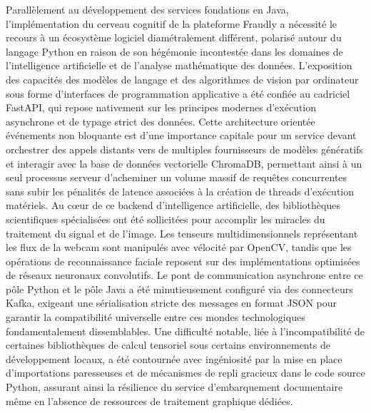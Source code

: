 Parallèlement au développement des services fondations en Java, l'implémentation du cerveau cognitif de la plateforme Fraudly a nécessité le recours à un écosystème logiciel diamétralement différent, polarisé autour du langage Python en raison de son hégémonie incontestée dans les domaines de l'intelligence artificielle et de l'analyse mathématique des données. L'exposition des capacités des modèles de langage et des algorithmes de vision par ordinateur sous forme d'interfaces de programmation applicative a été confiée au cadriciel FastAPI, qui repose nativement sur les principes modernes d'exécution asynchrone et de typage strict des données. Cette architecture orientée événements non bloquante est d'une importance capitale pour un service devant orchestrer des appels distants vers de multiples fournisseurs de modèles génératifs et interagir avec la base de données vectorielle ChromaDB, permettant ainsi à un seul processus serveur d'acheminer un volume massif de requêtes concurrentes sans subir les pénalités de latence associées à la création de threads d'exécution matériels. Au cœur de ce backend d'intelligence artificielle, des bibliothèques scientifiques spécialisées ont été sollicitées pour accomplir les miracles du traitement du signal et de l'image. Les tenseurs multidimensionnels représentant les flux de la webcam sont manipulés avec vélocité par OpenCV, tandis que les opérations de reconnaissance faciale reposent sur des implémentations optimisées de réseaux neuronaux convolutifs. Le pont de communication asynchrone entre ce pôle Python et le pôle Java a été minutieusement configuré via des connecteurs Kafka, exigeant une sérialisation stricte des messages en format JSON pour garantir la compatibilité universelle entre ces mondes technologiques fondamentalement dissemblables. Une difficulté notable, liée à l'incompatibilité de certaines bibliothèques de calcul tensoriel sous certains environnements de développement locaux, a été contournée avec ingéniosité par la mise en place d'importations paresseuses et de mécanismes de repli gracieux dans le code source Python, assurant ainsi la résilience du service d'embarquement documentaire même en l'absence de ressources de traitement graphique dédiées.

